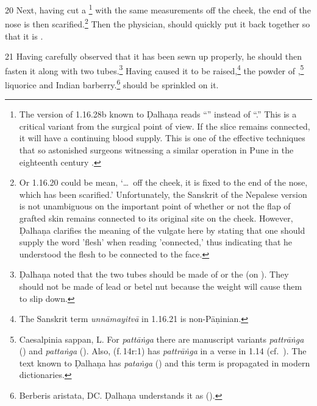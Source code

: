 \begin{translation}
    \item[20] Next, having cut a \footnote{The
    version of 1.16.28b known to Ḍalhaṇa \citep[81]{vulgate} reads “” instead of “.”
    This is a critical variant from the surgical point of view.  If the slice remains
    connected, it will have a continuing blood supply.  This is one of the effective 
    techniques that so astonished surgeons witnessing a similar operation in Pune in
    the eighteenth century \citep[see][67--70]{wuja-2003}.} with the same
    measurements off the cheek, the end of the nose is then scarified.\footnote{Or 1.16.20 could be mean, 
    `\ldots\ off the cheek, it is fixed to the end of the nose, which has been
    scarified.' Unfortunately, the Sanskrit of the Nepalese version is not unambiguous on the
    important point of whether or not the flap of grafted skin remains connected
    to its original site on the cheek. However, Ḍalhaṇa \citep[81]{vulgate} clarifies the meaning of the vulgate here by stating that one should supply the word 'flesh' when reading 'connected,' thus indicating that he understood the flesh to be connected to the face.} %
%
Then the  physician, 
    should quickly put it back together so that it is 
    .
    \label{well-joined}
    
    \item[21] 
    Having carefully observed that it has been sewn up properly,
    he should then fasten it along with two tubes.\footnote{Ḍalhaṇa noted that the two tubes 
    should be made of  or the  (on ). They should not be made of 
    lead or betel nut because the weight will cause them to slip down.}  
    Having caused it to be raised,\footnote{The 
    Sanskrit term \emph{unnāmayitvā} in 1.16.21 is non-Pāṇinian.}
    the powder of ,\footnote{Caesalpinia sappan, L. 
    For \emph{pattāṅga} there are manuscript variants 
    \emph{pattrāṅga} () and \emph{pattaṅga} 
    ().  Also,  
    (f.\,14r:1) has \emph{pattrāṅga} in a verse in 1.14 (cf.\ ). The 
    text known to Ḍalhaṇa  has \emph{pataṅga} () and this term 
    is propagated in modern dictionaries.}
    {liquorice}
    and
    Indian barberry.\footnote{Berberis aristata, DC.
Ḍalhaṇa understands it as  (\cite[81]{vulgate}).}
    should be sprinkled on it.
    

\end{translation}
